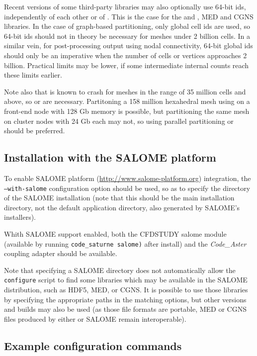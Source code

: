 \documentclass[a4paper,10pt,twoside]{csshortdoc}
\begin{document}
Recent versions of some third-party libraries may also optionally use 64-bit ids,
independently of each other or of \CS.
This is the case for the \scotch and \metis, MED and
CGNS libraries. In the case of graph-based partitioning, only
global cell ids are used, so 64-bit ids should not in theory be necessary
for meshes under 2 billion cells. In a similar vein, for post-processing output
using nodal connectivity, 64-bit global ids should only be an imperative
when the number of cells or vertices approaches 2 billion.
Practical limits may be lower, if some intermediate internal counts
reach these limits earlier.

Note also that  is known to crash for meshes in the range of
35 million cells and above, so  or \scotch are necessary.
Partitoning a 158 million hexahedral mesh using 
on a front-end node with 128 Gb memory is possible,
but partitioning the same mesh on cluster nodes with 24 Gb each
may not, so using parallel partitioning \ptscotch or \parmetis
should be preferred.

\subsection{Installation with the SALOME platform\label{sec:config:salome}}

To enable SALOME platform (\url{http://www.salome-platform.org}) integration,
the \texttt{--with-salome} configuration option should be used, so as to
specify the directory of the SALOME installation (note that this should be
the main installation directory, not the default application directory,
also generated by SALOME's installers).

Whith SALOME support enabled, both the CFDSTUDY salome module
(available by running \texttt{code\_saturne salome)} after install)
and the \textit{Code\_Aster} coupling adapter should be available.

Note that specifying a SALOME directory does not automatically
allow the \CS \texttt{configure} script to find some libraries
which may be available in the SALOME distribution, such as HDF5,
MED, or CGNS. It is possible to use those libraries by specifying
the appropriate paths in the matching options, but other versions and builds
may also be used (as those file formats are portable, MED or CGNS files produced
by either \CS or SALOME remain interoperable).

\subsection{Example configuration commands\label{sec:config:examples}}
\end{document}
